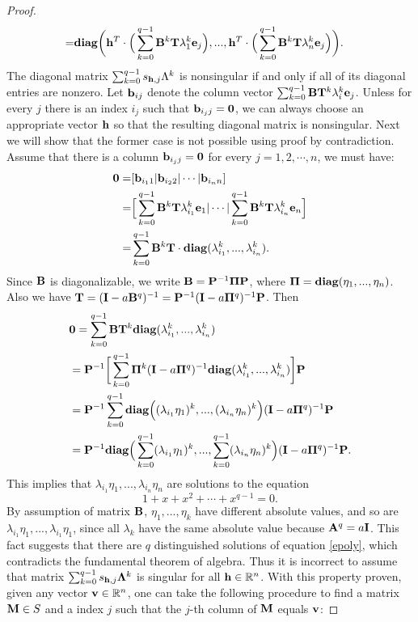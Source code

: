 \documentclass{article}
\begin{document}
\begin{proof}
\begin{align*}
=& {\bf diag}\bigg({\bf h}^T\cdot\Big(\sum_{k=0}^{q-1}{\bf B}^k{\bf T}\lambda_1^k{\bf e}_j\Big),...,{\bf h}^T\cdot\Big(\sum_{k=0}^{q-1}{\bf B}^k{\bf T}\lambda_n^k{\bf e}_j\Big)\bigg).
\end{align*}
The diagonal matrix $\sum_{k=0}^{q-1}s_{{\bf h}, j}\Lambda^k$ is nonsingular if and only if all of its diagonal entries are nonzero. Let ${\bf b}_{ij}$ denote the column vector $\sum_{k=0}^{q-1}{\bf B}{\bf T}^k\lambda_i^k{\bf e}_j$. Unless for every $j$ there is an index $i_j$ such that ${\bf b}_{i_jj}={\bf 0}$, we can always choose an appropriate vector ${\bf h}$ so that the resulting diagonal matrix is nonsingular. Next we will show that the former case is not possible using proof by contradiction. Assume that there is a column ${\bf b}_{i_jj}={\bf 0}$ for every $j=1,2,\cdots,n$, we must have:
\begin{align*}
{\bf 0}
=& [{\bf b}_{i_11}|{\bf b}_{i_22}|\cdots|{\bf b}_{i_nn}]\\
=& \Big[\sum_{k=0}^{q-1}{\bf B}^k{\bf T}\lambda_{i_1}^k{\bf e}_1|\cdots|\sum_{k=0}^{q-1}{\bf B}^k{\bf T}\lambda_{i_n}^k{\bf e}_n\Big]\\
=& \sum_{k=0}^{q-1}{\bf B}^k{\bf T} \cdot{\bf diag}(\lambda_{i_1}^k,...,\lambda_{i_n}^k).
\end{align*}
Since ${\bf B}$ is diagonalizable, we write ${\bf B} = {\bf P}^{-1}{\bf \Pi P}$, where ${\bf \Pi} = {\bf diag}(\eta_1,...,\eta_n)$. Also we have ${\bf T}=({\bf I} - a{\bf B}^q)^{-1}={\bf P}^{-1}({\bf I} - a{\bf \Pi}^q)^{-1}{\bf P}$. Then
\begin{align*}
&{\bf 0} = \sum_{k=0}^{q-1}{\bf B}{\bf T}^k{\bf diag}(\lambda_{i_1}^k,...,\lambda_{i_n}^k)\\
&= {\bf P}^{-1}\bigg[\sum_{k=0}^{q-1}{\bf \Pi}^k ({\bf I} - a{\bf \Pi}^q)^{-1}{\bf diag}(\lambda_{i_1}^k,...,\lambda_{i_n}^k)\bigg] {\bf P}\\
&= {\bf P}^{-1}\sum_{k=0}^{q-1}{\bf diag}\Big((\lambda_{i_1}\eta_1)^k,...,(\lambda_{i_n}\eta_n)^k\Big) ({\bf I} - a{\bf \Pi}^q)^{-1}{\bf P}\\
&= {\bf P}^{-1}{\bf diag}\Big(\sum_{k=0}^{q-1}(\lambda_{i_1}\eta_1)^k,...,\sum_{k=0}^{q-1}(\lambda_{i_n}\eta_n)^k\Big) ({\bf I} - a{\bf \Pi}^q)^{-1}{\bf P}.
\end{align*}
This implies that $\lambda_{i_1}\eta_1, ...,\lambda_{i_n}\eta_n$ are solutions to the equation
\begin{equation}
\label{epoly}
1+x+x^2+\cdots+x^{q-1}=0.
\end{equation}
By assumption of matrix ${\bf B}$, $\eta_1,...,\eta_k$ have different absolute values, and so are $\lambda_{i_1}\eta_1,...,\lambda_{i_1}\eta_1$, since all $\lambda_k$ have the same absolute value because ${\bf A}^q = a{\bf I}$. This fact suggests that there are $q$ distinguished solutions of equation \eqref{epoly}, which contradicts the fundamental theorem of algebra. Thus it is incorrect to assume that matrix $\sum_{k=0}^{q-1}s_{{\bf h}, j}{\bf \Lambda}^k$ is singular for all ${\bf h}\in\mathbb{R}^n$. With this property proven, given any vector ${\bf v}\in\mathbb{R}^n$, one can take the following procedure to find a matrix ${\bf M}\in S$ and a index $j$ such that the $j$-th column of ${\bf M}$ equals ${\bf v}$:


\end{proof}
\end{document}

